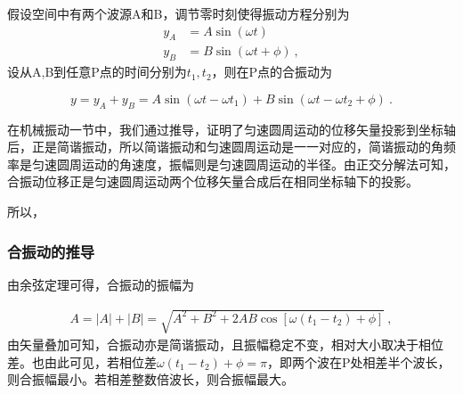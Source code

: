 假设空间中有两个波源A和B，调节零时刻使得振动方程分别为
\begin{equation}
\begin{aligned}
y_A&=A\sin(\omega t)\\
y_B&=B\sin (\omega t+\phi)~,
\end{aligned}
\end{equation}
设从A,B到任意P点的时间分别为$t_1,t_2$，则在P点的合振动为

\begin{equation}
y=y_A+y_B=A\sin(\omega t-\omega t_1)+B\sin(\omega t-\omega t_2+\phi)~.
\end{equation}

在机械振动一节中，我们通过推导，证明了匀速圆周运动的位移矢量投影到坐标轴后，正是简谐振动，所以简谐振动和匀速圆周运动是一一对应的，简谐振动的角频率是匀速圆周运动的角速度，振幅则是匀速圆周运动的半径。由正交分解法可知，合振动位移正是匀速圆周运动两个位移矢量合成后在相同坐标轴下的投影。

所以，
\subsubsection{合振动的推导}
由余弦定理可得，合振动的振幅为

\begin{equation}
\begin{aligned}
A=|A|+|B|=\sqrt{A^2+B^2+2AB\cos[\omega(t_1-t_2)+\phi]}~,
\end{aligned}
\end{equation}
由矢量叠加可知，合振动亦是简谐振动，且振幅稳定不变，相对大小取决于相位差。也由此可见，若相位差$\omega(t_1-t_2)+\phi=\pi$，即两个波在P处相差半个波长，则合振幅最小。若相差整数倍波长，则合振幅最大。